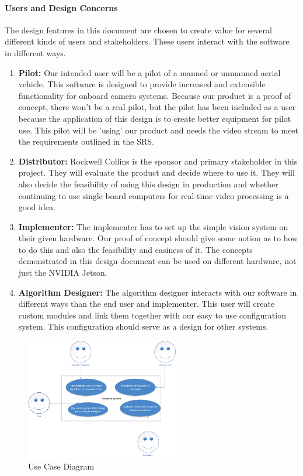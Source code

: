 	\paragraph{Users and Design Concerns}
	The design features in this document are chosen to create value for several different
kinds of users and stakeholders. These users interact with the software in different ways.\\
	\begin{enumerate}[leftmargin=2cm,labelindent=2cm]
    	\item \textbf{Pilot:}
	Our intended user will be a pilot of a manned or unmanned aerial vehicle. This software
	is designed to provide increased and extensible functionality for onboard camera
	systems. Because our product is a proof of concept, there won't be a real pilot, but the
	pilot has been included as a user because the application of this design is to create
	better equipment for pilot use. This pilot will be 'using' our product and needs the
	video stream to meet the requirements outlined in the SRS.
	\item \textbf{Distributor:}
	Rockwell Collins is the sponsor and primary stakeholder in this project. They will
	evaluate the product and decide where to use it. They will also decide the feasibility of
	using this design in production and whether continuing to use single board computers
	for real-time video processing is a good idea.
	\item \textbf{Implementer:}
	The implementer has to set up the simple vision system on their given hardware. Our
	proof of concept should give some notion as to how to do this and also the feasibility
	and easiness of it. The concepts demonstrated in this design document can be used on
	different hardware, not just the NVIDIA Jetson.
	\item \textbf{Algorithm Designer:}
	The algorithm designer interacts with our software in different ways than the end user
	and implementer. This user will create custom modules and link them together with our
	easy to use configuration system. This configuration should serve as a design for other
	systems.\\
	\end{enumerate}

		\begin{figure}[H] 
		\centering
		\includegraphics[width=0.6\textwidth,natwidth=610,natheight=642]{images/UseCase_Diagram.png} 
		\caption{Use Case Diagram}
		\end{figure}
	
